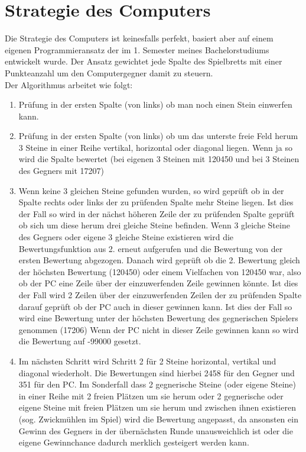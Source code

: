 \documentclass[10pt,a4paper,titlepage]{article}
\begin{document}
\section{Strategie des Computers}
Die Strategie des Computers ist keinesfalls perfekt, basiert aber auf einem eigenen Programmieransatz der im 1. Semester meines Bachelorstudiums entwickelt wurde. Der Ansatz gewichtet jede Spalte des Spielbretts mit einer Punkteanzahl um den Computergegner damit zu steuern.\\
Der Algorithmus arbeitet wie folgt:
\begin{enumerate}
	\item Prüfung in der ersten Spalte (von links) ob man noch einen Stein einwerfen kann. 
	\item Prüfung in der ersten Spalte (von links) ob um das unterste freie Feld herum 3 Steine in einer Reihe vertikal, horizontal oder diagonal liegen.
    Wenn ja so wird die Spalte bewertet (bei eigenen 3 Steinen mit 120450 und bei 3 Steinen des Gegners mit 17207)
	\item  Wenn keine 3 gleichen Steine gefunden wurden, so wird geprüft ob in der Spalte rechts oder links der zu prüfenden Spalte mehr Steine liegen.
   Ist dies der Fall so wird in der nächst höheren Zeile der zu prüfenden Spalte geprüft ob sich um diese herum drei gleiche Steine befinden.
   Wenn 3 gleiche Steine des Gegners oder eigene 3 gleiche Steine existieren wird die Bewertungsfunktion aus 2. erneut aufgerufen und die Bewertung von der ersten Bewertung abgezogen.
   Danach wird geprüft ob die 2. Bewertung gleich der höchsten Bewertung (120450) oder einem Vielfachen von 120450 war, also ob der PC eine Zeile über der einzuwerfenden Zeile gewinnen könnte.
   Ist dies der Fall wird 2 Zeilen über der einzuwerfenden Zeilen der zu prüfenden Spalte darauf geprüft ob der PC auch in dieser gewinnen kann.
   Ist dies der Fall so wird eine Bewertung unter der höchsten Bewertung des gegnerischen Spielers genommen (17206)
   Wenn der PC nicht in dieser Zeile gewinnen kann so wird die Bewertung auf -99000 gesetzt.
	\item Im nächsten Schritt wird Schritt 2 für 2 Steine horizontal, vertikal und diagonal wiederholt. Die Bewertungen sind hierbei 2458 für den Gegner und 351 für den PC.
   Im Sonderfall dass 2 gegnerische Steine (oder eigene Steine) in einer Reihe mit 2 freien Plätzen um sie herum oder 2 gegnerische oder eigene Steine mit freien Plätzen um sie herum und zwischen ihnen existieren (sog. Zwickmühlen im Spiel) wird die Bewertung angepasst, da ansonsten ein Gewinn des Gegners in der übernächsten Runde unausweichlich ist oder die eigene Gewinnchance dadurch merklich gesteigert werden kann.

\end{enumerate}
\end{document}
